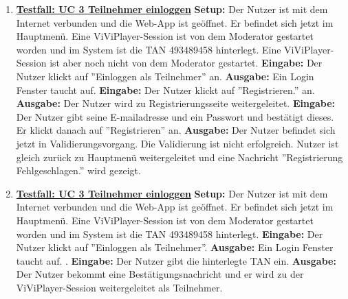\begin{enumerate}
	\item \underline{\textbf{Testfall: UC 3 Teilnehmer einloggen}} \linebreak
	\textbf{Setup:} Der Nutzer ist mit dem Internet verbunden und die Web-App ist geöffnet. Er befindet sich jetzt im Hauptmenü. Eine ViViPlayer-Session ist von dem Moderator gestartet worden und im System ist die TAN 493489458 hinterlegt.
	Eine ViViPlayer-Session ist aber noch nicht von dem Moderator gestartet. \linebreak
	\textbf{Eingabe:} Der Nutzer klickt auf ''Einloggen als Teilnehmer'' an. \linebreak
	\textbf{Ausgabe:} Ein Login Fenster taucht auf.\linebreak
	\textbf{Eingabe:} Der Nutzer klickt auf ''Registrieren.'' an.\linebreak
	\textbf{Ausgabe:} Der Nutzer wird zu Registrierungsseite weitergeleitet.\linebreak
	\textbf{Eingabe:} Der Nutzer gibt seine E-mailadresse und ein Passwort und bestätigt dieses. Er klickt danach auf ''Registrieren'' an. \linebreak
	\textbf{Ausgabe:} Der Nutzer befindet sich jetzt in Validierungsvorgang. Die Validierung ist nicht erfolgreich. Nutzer ist gleich zurück zu Hauptmenü weitergeleitet und eine Nachricht ''Registrierung Fehlgeschlagen.'' wird gezeigt.\linebreak
	
	\item \underline{\textbf{Testfall: UC 3 Teilnehmer einloggen}} \linebreak
	\textbf{Setup:} Der Nutzer ist mit dem Internet verbunden und die Web-App ist geöffnet. Er befindet sich jetzt im Hauptmenü. Eine ViViPlayer-Session ist von dem Moderator gestartet worden und im System ist die TAN 493489458 hinterlegt. \linebreak
	\textbf{Eingabe:} Der Nutzer klickt auf ''Einloggen als Teilnehmer''. \linebreak
	\textbf{Ausgabe:} Ein Login Fenster taucht auf. .\linebreak
	\textbf{Eingabe:} Der Nutzer gibt die hinterlegte TAN ein. \linebreak
	\textbf{Ausgabe:} Der Nutzer bekommt eine Bestätigungsnachricht und er wird zu der ViViPlayer-Session weitergeleitet als Teilnehmer.\linebreak \linebreak \linebreak \linebreak


\end{enumerate}
